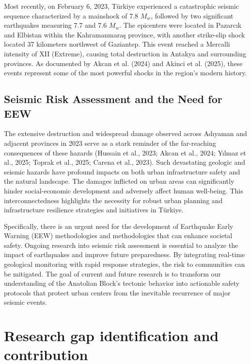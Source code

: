 \documentclass[data,article,submit,pdftex,moreauthors]{Definitions/mdpi}
\begin{document}
Most recently, on February 6, 2023, Türkiye experienced a catastrophic seismic sequence characterized by a mainshock of 7.8 $M_w$, followed by two significant earthquakes measuring 7.7 and 7.6 $M_w$. The epicenters were located in Pazarcık and Elbistan within the Kahramanmaraş province, with another strike-slip shock located 37 kilometers northwest of Gaziantep. This event reached a Mercalli intensity of XII (Extreme), causing total destruction in Antakya and surrounding provinces. As documented by Akcan et al. (2024) and Akinci et al. (2025), these events represent some of the most powerful shocks in the region’s modern history.

\subsection{Seismic Risk Assessment and the Need for EEW}

The extensive destruction and widespread damage observed across Adıyaman and adjacent provinces in 2023 serve as a stark reminder of the far-reaching consequences of these hazards (Hussain et al., 2023; Akcan et al., 2024; Yılmaz et al., 2025; Toprak et al., 2025; Carena et al., 2023). Such devastating geologic and seismic hazards have profound impacts on both urban infrastructure safety and the natural landscape. The damages inflicted on urban areas can significantly hinder social-economic development and adversely affect human well-being. This interconnectedness highlights the necessity for robust urban planning and infrastructure resilience strategies and initiatives in Türkiye. 

Specifically, there is an urgent need for the development of Earthquake Early Warning (EEW) methodologies and methodologies that can enhance societal safety. Ongoing research into seismic risk assessment is essential to analyze the impact of earthquakes and improve future preparedness. By integrating real-time geological monitoring with rapid response strategies, the risk to communities can be mitigated. The goal of current and future research is to transform our understanding of the Anatolian Block’s tectonic behavior into actionable safety protocols that protect urban centers from the inevitable recurrence of major seismic events.


\section{Research gap identification and contribution}
\end{document}
